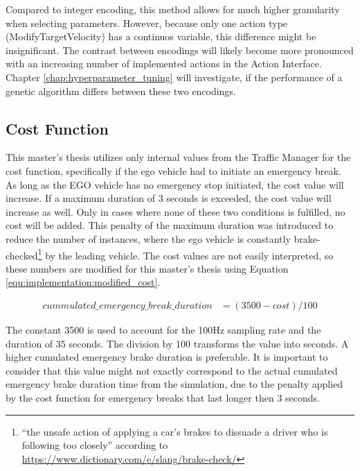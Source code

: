 Compared to integer encoding, this method allows for much higher granularity when selecting parameters. However, because only one action type (ModifyTargetVelocity) has a continuos variable, this difference might be insignificant. The contrast between encodings will likely become more pronounced with an increasing number of implemented actions in the Action Interface. Chapter \ref{chap:hyperparameter_tuning} will investigate, if the performance of a genetic algorithm differs between these two encodings.

\subsection{Cost Function}
\label{sect:implementation:cost_function}
This master's thesis utilizes only internal values from the Traffic Manager for the cost function, specifically if the ego vehicle had to initiate an emergency break. As long as the EGO vehicle has no emergency stop initiated, the cost value will increase. If a maximum duration of 3 seconds is exceeded, the cost value will increase as well. Only in cases where none of these two conditions is fulfilled, no cost will be added. This penalty of the maximum duration was introduced to reduce the number of instances, where the ego vehicle is constantly brake-checked\footnote{\enquote{the unsafe action of applying a car’s brakes to dissuade a driver who is following too closely} according to \href{https://www.dictionary.com/e/slang/brake-check/}{https://www.dictionary.com/e/slang/brake-check/}} by the leading vehicle. The cost values are not easily interpreted, so these numbers are modified for this master's thesis using Equation \ref{equ:implementation:modified_cost}.

\begin{equation} 
	\begin{split}
		cummulated\_emergency\_break\_duration & = (3500 - cost) / 100
	\end{split}
	\label{equ:implementation:modified_cost}
\end{equation}

The constant 3500 is used to account for the 100Hz sampling rate and the duration of 35 seconds. The division by 100 transforms the value into seconds. A higher cumulated emergency brake duration is preferable. It is important to consider that this value might not exactly correspond to the actual cumulated emergency brake duration time from the simulation, due to the penalty applied by the cost function for emergency breaks that last longer then 3 seconds.

